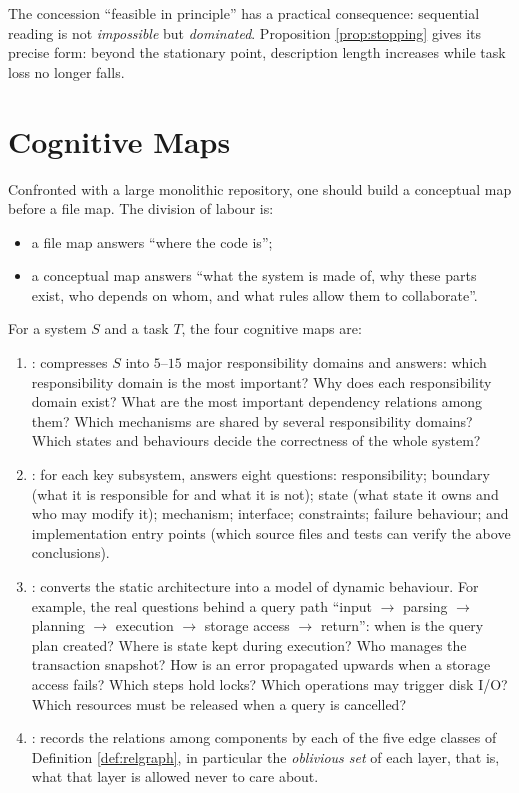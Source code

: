 The concession ``feasible in principle'' has a practical consequence: sequential reading is
not \emph{impossible} but \emph{dominated}. Proposition \ref{prop:stopping} gives its precise
form: beyond the stationary point, description length increases while task loss no longer
falls.

\section{Cognitive Maps}\label{sec:maps}

Confronted with a large monolithic repository, one should build a conceptual map before a file
map. The division of labour is:

\begin{itemize}
\item a file map answers ``where the code is'';
\item a conceptual map answers ``what the system is made of, why these parts exist, who
      depends on whom, and what rules allow them to collaborate''.
\end{itemize}

\begin{definition}\label{def:fourmaps}
For a system $S$ and a task $T$, the four cognitive maps are:
\begin{enumerate}[label=(\roman*)]
\item {}: compresses $S$ into $5$--$15$ major responsibility domains and
      answers: which responsibility domain is the most important? Why does each
      responsibility domain exist? What are the most important dependency relations among
      them? Which mechanisms are shared by several responsibility domains? Which states and
      behaviours decide the correctness of the whole system?
\item {}: for each key subsystem, answers eight questions:
      responsibility; boundary (what it is responsible for and what it is not); state (what
      state it owns and who may modify it); mechanism; interface; constraints; failure
      behaviour; and implementation entry points (which source files and tests can verify the
      above conclusions).
\item {}: converts the static architecture into a model of dynamic
      behaviour. For example, the real questions behind a query path ``input $\to$ parsing
      $\to$ planning $\to$ execution $\to$ storage access $\to$ return'': when is the query
      plan created? Where is state kept during execution? Who manages the transaction
      snapshot? How is an error propagated upwards when a storage access fails? Which steps
      hold locks? Which operations may trigger disk I/O? Which resources must be released
      when a query is cancelled?
\item {}: records the relations among components by each of the five edge
      classes of Definition \ref{def:relgraph}, in particular the \emph{oblivious set} of each
      layer, that is, what that layer is allowed never to care about.
\end{enumerate}
\end{definition}

